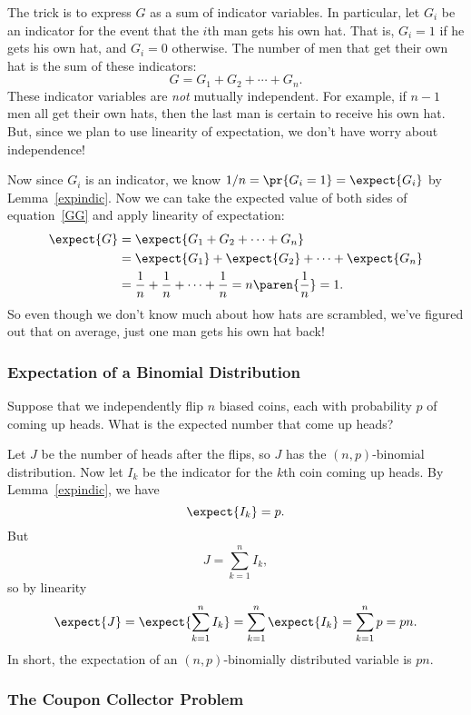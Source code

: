 The trick is to express $G$ as a sum of indicator variables.  In
particular, let $G_i$ be an indicator for the event that the $i$th man
gets his own hat.  That is, $G_i = 1$ if he gets his own hat, and $G_i =
0$ otherwise.  The number of men that get their own hat is the sum of
these indicators:
%
\begin{equation}\label{GG}
G = G_1 + G_2 + \cdots + G_n.
\end{equation}
%
These indicator variables are \textit{not} mutually independent.  For
example, if $n-1$ men all get their own hats, then the last man is
certain to receive his own hat.  But, since we plan to use linearity
of expectation, we don't have worry about independence!

Now since $G_i$ is an indicator, we know $1/n = \pr{G_i=1} = \expect{G_i}$
by Lemma~\ref{expindic}.  Now we can take the expected value of both sides
of equation~\eqref{GG} and apply linearity of expectation:
\begin{align*}
\expect{G} & = \expect{G_1 + G_2 + \cdots + G_n} \\
       & = \expect{G_1} + \expect{G_2} + \cdots + \expect{G_n}\\
       & = \frac{1}{n} + \frac{1}{n} + \cdots + \frac{1}{n} =
       n\paren{\frac{1}{n}} = 1.
\end{align*}
So even though we don't know much about how hats are scrambled, we've
figured out that on average, just one man gets his own hat back!


\subsubsection{Expectation of a Binomial Distribution}
Suppose that we independently flip $n$ biased coins, each with probability
$p$ of coming up heads.  What is the expected number that come up heads?

Let $J$ be the number of heads after the flips, so $J$ has the
$(n,p)$-binomial distribution.  Now let $I_k$ be the indicator for the
$k$th coin coming up heads.  By Lemma~\ref{expindic}, we have
\[
\expect{I_k} = p.
\]
But
\[
J = \sum_{k=1}^n I_k,
\]
so by linearity
\[
\expect{J} = \expect{\sum_{k=1}^n I_k} = \sum_{k=1}^n \expect{I_k} =
\sum_{k=1}^n p = pn.
\]
In short, the expectation of an $(n,p)$-binomially distributed variable is
$pn$.


\subsubsection{The Coupon Collector Problem}

